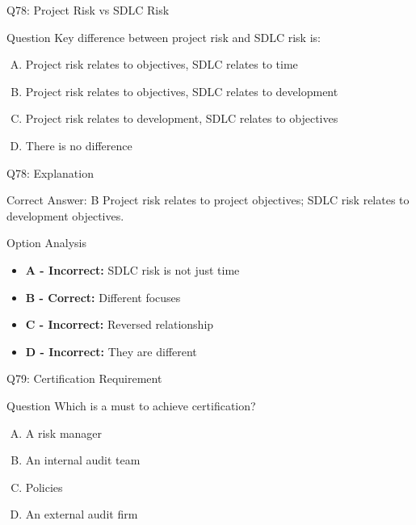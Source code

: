 \documentclass{beamer}
\begin{document}
	\begin{frame}{Q78: Project Risk vs SDLC Risk}
		\begin{block}{Question}
			Key difference between project risk and SDLC risk is:
		\end{block}
		\begin{enumerate}[(A)]
			\item Project risk relates to objectives, SDLC relates to time
			\item Project risk relates to objectives, SDLC relates to development
			\item Project risk relates to development, SDLC relates to objectives
			\item There is no difference
		\end{enumerate}
	\end{frame}
	
	\begin{frame}{Q78: Explanation}
		\begin{block}{Correct Answer: B}
			Project risk relates to project objectives; SDLC risk relates to development objectives.
		\end{block}
		\begin{block}{Option Analysis}
			\begin{itemize}
				\item \textbf{A - Incorrect:} SDLC risk is not just time
				\item \textbf{B - Correct:} Different focuses
				\item \textbf{C - Incorrect:} Reversed relationship
				\item \textbf{D - Incorrect:} They are different
			\end{itemize}
		\end{block}
	\end{frame}
	
	\begin{frame}{Q79: Certification Requirement}
		\begin{block}{Question}
			Which is a must to achieve certification?
		\end{block}
		\begin{enumerate}[(A)]
			\item A risk manager
			\item An internal audit team
			\item Policies
			\item An external audit firm
		\end{enumerate}
	\end{frame}
	
\end{document}
